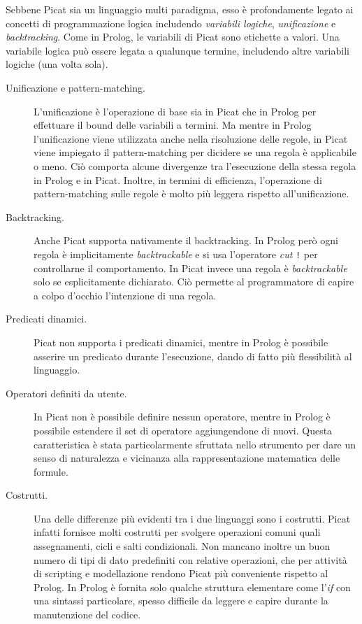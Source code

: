 \documentclass[12pt,a4paper,openright]{book} %
\begin{document}
Sebbene Picat sia un linguaggio multi paradigma, esso è profondamente
legato ai concetti di programmazione logica includendo \emph{variabili
  logiche}, \emph{unificazione} e \emph{backtracking}.  Come in
Prolog, le variabili di Picat sono etichette a valori. Una variabile
logica può essere legata a qualunque termine, includendo altre
variabili logiche (una volta sola).

\begin{description}
\item[Unificazione e pattern-matching.] L'unificazione è l'operazione
  di base sia in Picat che in Prolog per effettuare il bound delle
  variabili a termini. Ma mentre in Prolog l'unificazione viene
  utilizzata anche nella risoluzione delle regole, in Picat viene
  impiegato il pattern-matching per dicidere se una regola è
  applicabile o meno. Ciò comporta alcune divergenze tra l'esecuzione
  della stessa regola in Prolog e in Picat.  Inoltre, in termini di
  efficienza, l'operazione di pattern-matching sulle regole è molto
  più leggera rispetto all'unificazione.
\item[Backtracking.] Anche Picat supporta nativamente il
  backtracking. In Prolog però ogni regola è implicitamente
  \emph{backtrackable} e si usa l'operatore \emph{cut} \verb|!| per
  controllarne il comportamento. In Picat invece una regola è
  \emph{backtrackable} solo se esplicitamente dichiarato. Ciò permette
  al programmatore di capire a colpo d'occhio l'intenzione di una
  regola.
\item[Predicati dinamici.] Picat non supporta i predicati dinamici,
  mentre in Prolog è possibile asserire un predicato durante
  l'esecuzione, dando di fatto più flessibilità al linguaggio.
\item[Operatori definiti da utente.] In Picat non è possibile definire
  nessun operatore, mentre in Prolog è possibile estendere il set di
  operatore aggiungendone di nuovi. Questa caratteristica è stata
  particolarmente sfruttata nello strumento \setlog per dare un senso
  di naturalezza e vicinanza alla rappresentazione matematica delle
  formule.
\item[Costrutti.] Una delle differenze più evidenti tra i due
  linguaggi sono i costrutti. Picat infatti fornisce molti costrutti
  per svolgere operazioni comuni quali assegnamenti, cicli e salti
  condizionali. Non mancano inoltre un buon numero di tipi di dato
  predefiniti con relative operazioni, che per attività di scripting e
  modellazione rendono Picat più conveniente rispetto al Prolog. In
  Prolog è fornita solo qualche struttura elementare come l'\emph{if}
  con una sintassi particolare, spesso difficile da leggere e capire
  durante la manutenzione del codice.
\end{description}
\end{document}

